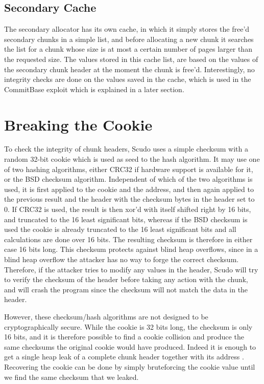 \documentclass[a4paper,11pt,oneside]{report}
\begin{document}
\section{Secondary Cache}

The secondary allocator has its own cache, in which it simply stores the free'd secondary
chunks in a simple list, and before allocating a new chunk it searches the list for a
chunk whose size is at most a certain number of pages larger than the requested size. The
values stored in this cache list, are based on the values of the secondary chunk header at
the moment the chunk is free'd. Interestingly, no integrity checks are done on the values
saved in the cache, which is used in the CommitBase exploit which is explained in a later
section.


\chapter{Breaking the Cookie}

To check the integrity of chunk headers, Scudo uses a simple checksum with a random 32-bit
cookie which is used as seed to the hash algorithm. It may use one of two hashing
algorithms, either CRC32 if hardware support is available for it, or the BSD checksum
algorithm. Independent of which of the two algorithms is used, it is first applied to the
cookie and the address, and then again applied to the previous result and the header with
the checksum bytes in the header set to 0. If CRC32 is used, the result is then xor'd with
itself shifted right by 16 bits, and truncated to the 16 least significant bits, whereas
if the BSD checksum is used the cookie is already truncated to the 16 least significant
bits and all calculations are done over 16 bits. The resulting checksum is therefore in
either case 16 bits long.
This checksum protects against blind heap overflows, since in a blind heap overflow the
attacker has no way to forge the correct checksum. Therefore, if the attacker tries to
modify any values in the header, Scudo will try to verify the checksum of the header
before taking any action with the chunk, and will crash the program since the checksum
will not match the data in the header.

However, these checksum/hash algorithms are not designed to be cryptographically
secure. While the cookie is 32 bits long, the checksum is only 16 bits, and it is
therefore possible to find a cookie collision and produce the same checksums the original
cookie would have produced. Indeed it is enough to get a single heap leak of a complete
chunk header together with its address . 
Recovering the cookie can be done by simply bruteforcing the
cookie value until we find the same checksum that we leaked.
\end{document}
